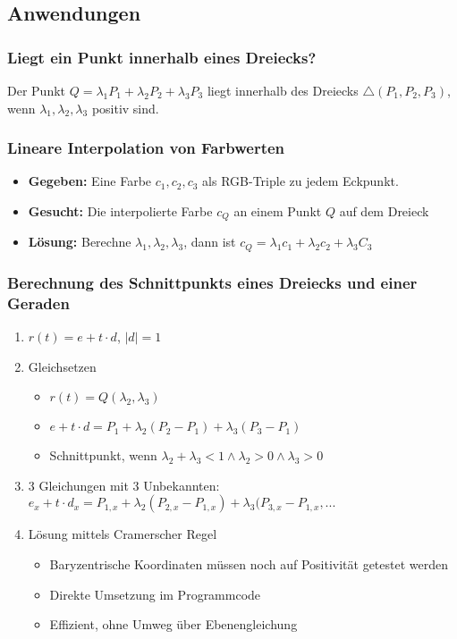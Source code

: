 \subsection{Anwendungen}

\subsubsection{Liegt ein Punkt innerhalb eines Dreiecks?}
Der Punkt \(Q = \lambda_1 P_1 + \lambda_2 P_2 + \lambda_3 P_3\) liegt innerhalb des Dreiecks \(\triangle(P_1,P_2,P_3)\), wenn \(\lambda_1,\lambda_2,\lambda_3\) positiv sind.

\subsubsection{Lineare Interpolation von Farbwerten}
\begin{itemize}
	\item \textbf{Gegeben:} Eine Farbe \(c_1,c_2,c_3\) als RGB-Triple zu jedem Eckpunkt.
	\item \textbf{Gesucht:} Die interpolierte Farbe \(c_Q\) an einem Punkt \(Q\) auf dem Dreieck
	\item \textbf{Lösung:} Berechne \(\lambda_1,\lambda_2,\lambda_3\), dann ist \(c_Q=\lambda_1 c_1+\lambda_2 c_2 + \lambda_3 C_3\)
\end{itemize}

\subsubsection{Berechnung des Schnittpunkts eines Dreiecks und einer Geraden}
\begin{enumerate}
	\item \(r(t) = e+t\cdot d\), \(|d|=1\)
	\item Gleichsetzen
	\begin{itemize}
		\item \(r(t) = Q(\lambda_2,\lambda_3)\)
		\item \(e+t\cdot d = P_1+\lambda_2(P_2-P_1)+\lambda_3(P_3-P_1)\)
		\item Schnittpunkt, wenn \(\lambda_2+\lambda_3<1 \wedge \lambda_2 > 0 \wedge \lambda_3 >0\)
	\end{itemize}
	\item 3 Gleichungen mit 3 Unbekannten: \(e_x+t\cdot d_x=P_{1,x}+\lambda_2(P_{2,x}-P_{1,x})+\lambda_3(P_{3,x}-P_{1,x},...\)
	\item Lösung mittels Cramerscher Regel
	\begin{itemize}
		\item Baryzentrische Koordinaten müssen noch auf Positivität getestet werden
		\item Direkte Umsetzung im Programmcode
		\item Effizient, ohne Umweg über Ebenengleichung
	\end{itemize}
\end{enumerate}




